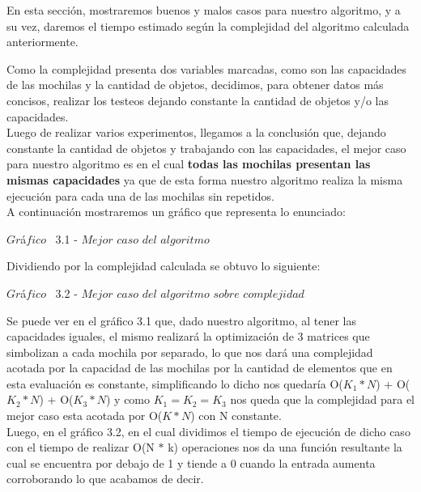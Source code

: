 \indent En esta secci\'on, mostraremos buenos y malos casos para nuestro algoritmo, y a su vez, daremos el tiempo estimado 
seg\'un la complejidad del algoritmo calculada anteriormente.

Como la complejidad presenta dos variables marcadas, como son las capacidades de las mochilas y la cantidad de objetos, decidimos, para obtener datos m\'as concisos, realizar los testeos dejando constante la cantidad de objetos y/o las capacidades.\\

Luego de realizar varios experimentos, llegamos a la conclusi\'on que, dejando constante la cantidad de objetos y trabajando con las capacidades, el mejor caso para nuestro algoritmo es en el cual \textbf{todas las mochilas presentan las mismas capacidades} ya que de esta forma nuestro algoritmo realiza la misma ejecuci\'on para cada una de las mochilas sin repetidos.\\
A continuaci\'on mostraremos un gr\'afico que representa lo enunciado:

\vspace*{0.3cm} \vspace*{0.3cm}
  \begin{center}
 {$Gr$\'a$fico$ \ 3.1 - $Mejor$ $caso$ $del$ $algoritmo$}
  \end{center}
  \vspace*{0.3cm}

Dividiendo por la complejidad calculada se obtuvo lo siguiente:\\

\vspace*{0.3cm} \vspace*{0.3cm}
  \begin{center}
 {$Gr$\'a$fico$ \ 3.2 - $Mejor$ $caso$ $del$ $algoritmo$ $sobre$ $complejidad$}
  \end{center}
  \vspace*{0.3cm}
  
Se puede ver en el gr\'afico 3.1 que, dado nuestro algoritmo, al tener las capacidades iguales, el mismo realizar\'a la optimizaci\'on de 3 matrices que simbolizan a cada mochila por separado, lo que nos dar\'a una complejidad acotada por la capacidad de las mochilas por la cantidad de elementos que en esta evaluaci\'on es constante, simplificando lo dicho nos quedar\'ia O($K_{1}\ast N$) + O($K_{2}\ast N$) + O($K_{3}\ast N$) y como $K_{1} = K_{2} = K_{3}$ nos queda que la complejidad para el mejor caso esta acotada por O($K \ast N$) con N constante.\\
Luego, en el gr\'afico 3.2, en el cual dividimos el tiempo de ejecuci\'on de dicho caso con el tiempo de realizar O(N $\ast$ k) operaciones nos da una funci\'on resultante la cual se encuentra por debajo de 1 y tiende a 0 cuando la entrada aumenta corroborando lo que acabamos de decir.\\

